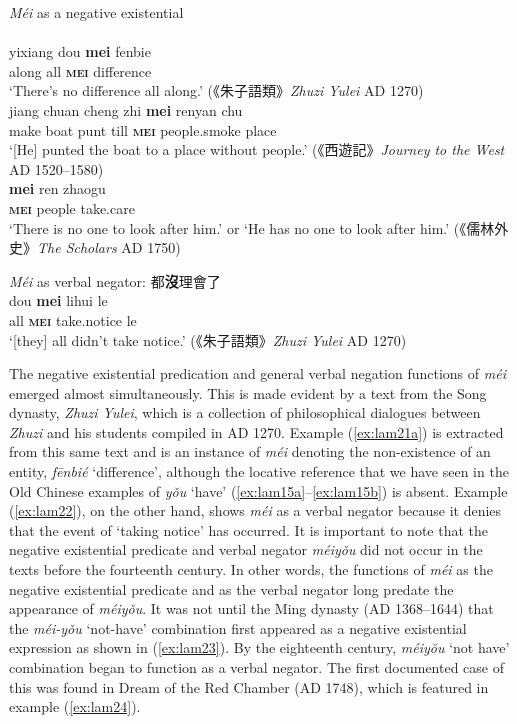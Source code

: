 \documentclass[output=paper]{langscibook}
\begin{document}
\ea \textit{Méi} as a negative existential \label{ex:lam21}\\
   \label{ex:lam21a}\\
  	\gll yixiang dou \textbf{mei} fenbie\\
  	along all \textbf{\textsc{mei}} difference\\
  	\glt `There's no difference all along.' ({\cn 《朱子語類》}\emph{Zhuzi Yulei} AD 1270)
   \label{ex:lam21b}\\
  	\gll jiang chuan cheng zhi \textbf{mei} renyan chu\\
  	make boat punt till \textbf{\textsc{mei}} people.smoke place\\
  	\glt `[He] punted the boat to a place without people.' ({\cn 《西遊記》}\emph{Journey to the West} AD 1520–1580)
   \label{ex:lam21c}\\
	\gll \textbf{mei} ren zhaogu\\
	\textbf{\textsc{mei}}	people	take.care\\
	\glt `There is no one to look after him.' or `He has no one to look after him.' ({\cn 《儒林外史》}\emph{The Scholars} AD 1750)
\z \z

\ea \textit{Méi} as verbal negator: {\cn 都\textbf{沒}理會了} \label{ex:lam22}\\
  \gll dou \textbf{mei} lihui le\\
  all \textbf{\textsc{mei}} take.notice le\\
  \glt `[they] all didn't take notice.' ({\cn 《朱子語類》}\emph{Zhuzi Yulei} AD 1270)
\z

The negative existential predication and general verbal negation functions of \textit{méi} emerged almost simultaneously. This is made evident by a text from the Song dynasty, \emph{Zhuzi Yulei}, which is a collection of philosophical dialogues between \emph{Zhuzi} and his students compiled in AD 1270. Example (\ref{ex:lam21a}) is extracted from this same text and is an instance of \textit{méi} denoting the non-existence of an entity, \textit{fēnbié} `difference', although the locative reference that we have seen in the Old Chinese examples of \textit{yǒu} `have' (\ref{ex:lam15a}–\ref{ex:lam15b}) is absent. Example (\ref{ex:lam22}), on the other hand, shows \textit{méi} as a verbal negator because it denies that the event of `taking notice' has occurred. It is important to note that the negative existential predicate and verbal negator \textit{méiyǒu} did not occur in the texts before the fourteenth century. In other words, the functions of \textit{méi} as the negative existential predicate and as the verbal negator long predate the appearance of \textit{méiyǒu}. It was not until the Ming dynasty (AD 1368–1644) that the \textit{méi-yǒu} `not-have' combination first appeared as a negative existential expression as shown in (\ref{ex:lam23}). By the eighteenth century, \textit{méiyŏu} `not have' combination began to function as a verbal negator. The first documented case of this was found in Dream of the Red Chamber (AD 1748), which is featured in example (\ref{ex:lam24}). 
\end{document}
